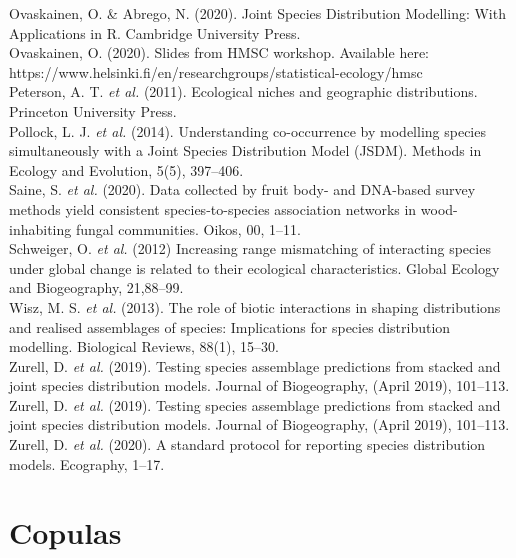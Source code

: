 \documentclass{article}
\begin{document}
Ovaskainen, O. \& Abrego, N. (2020). Joint Species Distribution Modelling: With Applications in R. Cambridge University Press.\\

Ovaskainen, O. (2020). Slides from HMSC workshop. Available here: \\https://www.helsinki.fi/en/researchgroups/statistical-ecology/hmsc\\

Peterson, A. T. \textit{et al.} (2011). Ecological niches and geographic distributions. Princeton University Press.\\

Pollock, L. J. \textit{et al.} (2014). Understanding co-occurrence by modelling species simultaneously with a Joint Species Distribution Model (JSDM). Methods in Ecology and Evolution, 5(5), 397–406.\\ 

Saine, S. \textit{et al.} (2020). Data collected by fruit body- and DNA-based survey methods yield consistent species-to-species association networks in wood-inhabiting fungal communities. Oikos, 00, 1–11.\\

Schweiger, O. \textit{et al.} (2012) Increasing range mismatching of interacting species under global change is related to their ecological characteristics. Global Ecology and Biogeography, 21,88–99. \\

Wisz, M. S. \textit{et al.} (2013). The role of biotic interactions in shaping distributions and realised assemblages of species: Implications for species distribution modelling. Biological Reviews, 88(1), 15–30.\\

Zurell, D. \textit{et al.} (2019). Testing species assemblage predictions from stacked and joint species distribution models. Journal of Biogeography, (April 2019), 101–113.\\

Zurell, D. \textit{et al.} (2019). Testing species assemblage predictions from stacked and joint species distribution models. Journal of Biogeography, (April 2019), 101–113. \\

Zurell, D. \textit{et al.} (2020). A standard protocol for reporting species distribution models. Ecography, 1–17.\\

\section{Copulas}
\end{document}
